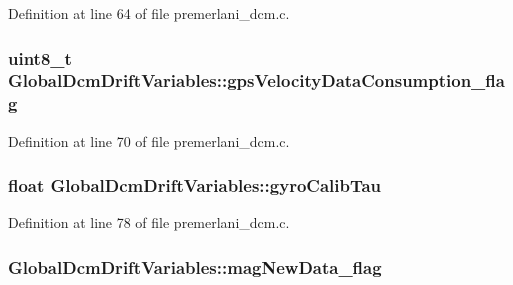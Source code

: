 Definition at line 64 of file premerlani\-\_\-dcm.\-c.

\hypertarget{struct_global_dcm_drift_variables_a27daf6a38cb6e81c64aba4bb8ac9f3fa}{
\subsubsection[{gps\-Velocity\-Data\-Consumption\-\_\-flag}]{ {\bf uint8\-\_\-t} Global\-Dcm\-Drift\-Variables\-::gps\-Velocity\-Data\-Consumption\-\_\-flag}}\label{struct_global_dcm_drift_variables_a27daf6a38cb6e81c64aba4bb8ac9f3fa}


Definition at line 70 of file premerlani\-\_\-dcm.\-c.

\hypertarget{struct_global_dcm_drift_variables_a3b2a14d2ee0eb630e1d8048391e1fdd4}{
\subsubsection[{gyro\-Calib\-Tau}]{\setlength{\rightskip}{0pt plus 5cm}float Global\-Dcm\-Drift\-Variables\-::gyro\-Calib\-Tau}}\label{struct_global_dcm_drift_variables_a3b2a14d2ee0eb630e1d8048391e1fdd4}


Definition at line 78 of file premerlani\-\_\-dcm.\-c.

\hypertarget{struct_global_dcm_drift_variables_a225159950d82f32b3c5fe0d4014488cf}{
\subsubsection[{mag\-New\-Data\-\_\-flag}]{ Global\-Dcm\-Drift\-Variables\-::mag\-New\-Data\-\_\-flag}}\label{struct_global_dcm_drift_variables_a225159950d82f32b3c5fe0d4014488cf}


